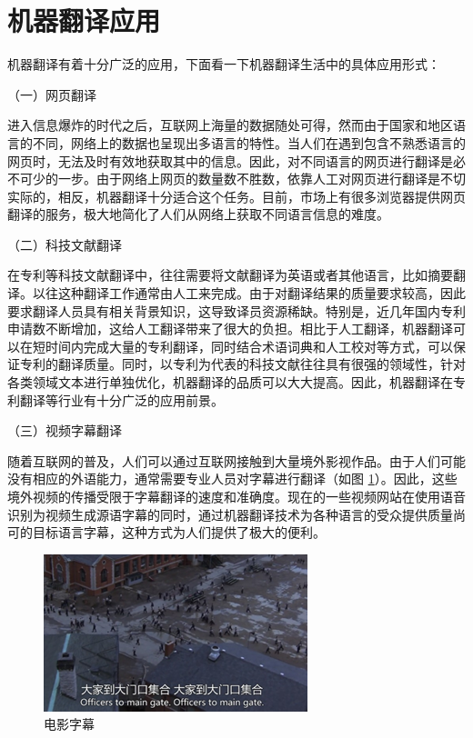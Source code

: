 \section{机器翻译应用}

\parinterval 机器翻译有着十分广泛的应用，下面看一下机器翻译生活中的具体应用形式：

\parinterval （一）网页翻译

\parinterval 进入信息爆炸的时代之后，互联网上海量的数据随处可得，然而由于国家和地区语言的不同，网络上的数据也呈现出多语言的特性。当人们在遇到包含不熟悉语言的网页时，无法及时有效地获取其中的信息。因此，对不同语言的网页进行翻译是必不可少的一步。由于网络上网页的数量数不胜数，依靠人工对网页进行翻译是不切实际的，相反，机器翻译十分适合这个任务。目前，市场上有很多浏览器提供网页翻译的服务，极大地简化了人们从网络上获取不同语言信息的难度。

\parinterval （二）科技文献翻译

\parinterval 在专利等科技文献翻译中，往往需要将文献翻译为英语或者其他语言，比如摘要翻译。以往这种翻译工作通常由人工来完成。由于对翻译结果的质量要求较高，因此要求翻译人员具有相关背景知识，这导致译员资源稀缺。特别是，近几年国内专利申请数不断增加，这给人工翻译带来了很大的负担。相比于人工翻译，机器翻译可以在短时间内完成大量的专利翻译，同时结合术语词典和人工校对等方式，可以保证专利的翻译质量。同时，以专利为代表的科技文献往往具有很强的领域性，针对各类领域文本进行单独优化，机器翻译的品质可以大大提高。因此，机器翻译在专利翻译等行业有十分广泛的应用前景。

\parinterval （三）视频字幕翻译

\parinterval 随着互联网的普及，人们可以通过互联网接触到大量境外影视作品。由于人们可能没有相应的外语能力，通常需要专业人员对字幕进行翻译（如图
\ref{fig:1-13}）。因此，这些境外视频的传播受限于字幕翻译的速度和准确度。现在的一些视频网站在使用语音识别为视频生成源语字幕的同时，通过机器翻译技术为各种语言的受众提供质量尚可的目标语言字幕，这种方式为人们提供了极大的便利。

\begin{figure}[htp]
    \centering
\includegraphics[scale=1.2]{./Chapter1/Figures/figure-film-subtitles.jpg}
    \caption{电影字幕}
    \label{fig:1-13}
\end{figure}

